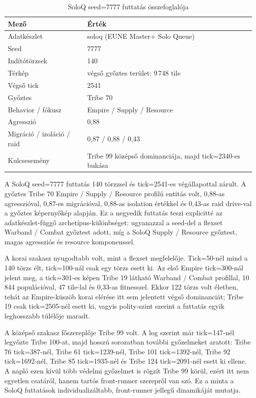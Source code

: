 \begin{table}[h]
\centering
\caption{SoloQ seed=7777 futtatás összefoglalója}
\label{tab:neurosim-run-sq7777-summary}
\begin{tabular}{ll}
\hline
\textbf{Mező} & \textbf{Érték} \\
\hline
Adatkészlet & soloq (EUNE Master+ Solo Queue) \\
Seed & 7777 \\
Indítótörzsek & 140 \\
Térkép & végső győztes terület: 9\,748 tile \\
Végső tick & 2541 \\
Győztes & Tribe 70 \\
Behavior / fókusz & Empire / Supply / Resource \\
Agresszió & 0,88 \\
Migráció / izoláció / raid & 0,87 / 0,88 / 0,43 \\
Kulcsesemény & Tribe 99 középső dominanciája, majd tick=2340-es bukása \\
\hline
\end{tabular}
\end{table}

A SoloQ seed=7777 futtatás 140 törzzsel és tick=2541-es végállapottal zárult. A győztes Tribe 70 Empire / Supply / Resource profilú entitás volt, 0,88-as agresszióval, 0,87-es migrációval, 0,88-as isolation értékkel és 0,43-as raid drive-val a győztes képernyőkép alapján. Ez a negyedik futtatás teszi explicitté az adatkészlet-függő archetípus-különbséget: ugyanazzal a seed-del a flexset Warband / Combat győztest adott, míg a SoloQ Supply / Resource győztest, magas agressziós és resource komponenssel.

A korai szakasz nyugodtabb volt, mint a flexset megfelelője. Tick=50-nél mind a 140 törzs élt, tick=100-nál csak egy törzs esett ki. Az első Empire tick=300-nál jelent meg, a tick=301-es képen Tribe 19 látható Warband / Combat profillal, 10\,844 populációval, 47 tile-lal és 0,33-as fitnesszel. Ekkor 122 törzs volt életben, tehát az Empire-küszöb korai elérése itt sem jelentett végső dominanciát; Tribe 19 csak tick=2505-nél esett ki, vagyis polity-szint szerint a futtatás egyik leghosszabb túlélője maradt.

A középső szakasz főszereplője Tribe 99 volt. A log szerint már tick=147-nél legyőzte Tribe 100-at, majd hosszú sorozatban további győzelmeket aratott: Tribe 76 tick=387-nél, Tribe 61 tick=1239-nél, Tribe 101 tick=1392-nél, Tribe 92 tick=1692-nél, Tribe 85 tick=1935-nél és Tribe 124 tick=2091-nél esett ki ellene. A napló ezen kívül több védelmi győzelmet is rögzít Tribe 99 körül, ezért itt nem egyetlen csatáról, hanem tartós front-runner szerepről van szó. Ez a minta a SoloQ futtatások individualizáltabb, front-runner jellegű dinamikáját mutatja.


